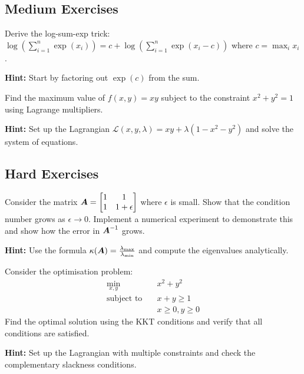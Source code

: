 \subsection{Medium Exercises}

\begin{problem}
\label{prob:log-sum-exp}
Derive the log-sum-exp trick: $\log\left(\sum_{i=1}^n \exp(x_i)\right) = c + \log\left(\sum_{i=1}^n \exp(x_i - c)\right)$ where $c = \max_i x_i$.

\textbf{Hint:} Start by factoring out $\exp(c)$ from the sum.
\end{problem}

\begin{problem}
\label{prob:lagrange-multipliers}
Find the maximum value of $f(x, y) = xy$ subject to the constraint $x^2 + y^2 = 1$ using Lagrange multipliers.

\textbf{Hint:} Set up the Lagrangian $\mathcal{L}(x, y, \lambda) = xy + \lambda(1 - x^2 - y^2)$ and solve the system of equations.
\end{problem}

\subsection{Hard Exercises}

\begin{problem}
\label{prob:matrix-inversion-stability}
Consider the matrix $\boldsymbol{A} = \begin{bmatrix} 1 & 1 \\ 1 & 1 + \epsilon \end{bmatrix}$ where $\epsilon$ is small. Show that the condition number grows as $\epsilon \to 0$. Implement a numerical experiment to demonstrate this and show how the error in $\boldsymbol{A}^{-1}$ grows.

\textbf{Hint:} Use the formula $\kappa(\boldsymbol{A}) = \frac{\lambda_{\max}}{\lambda_{\min}}$ and compute the eigenvalues analytically.
\end{problem}

\begin{problem}
\label{prob:kkt-conditions}
Consider the optimisation problem:
\begin{align}
\min_{x, y} \quad & x^2 + y^2 \\
\text{subject to} \quad & x + y \geq 1 \\
& x \geq 0, y \geq 0
\end{align}
Find the optimal solution using the KKT conditions and verify that all conditions are satisfied.

\textbf{Hint:} Set up the Lagrangian with multiple constraints and check the complementary slackness conditions.
\end{problem}

